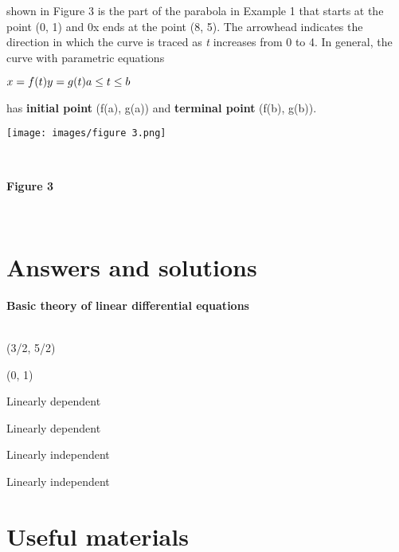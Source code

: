 \documentclass{article}
\begin{document}
shown in Figure 3 is the part of the parabola in Example 1 that starts at the point (0, 1) and 0x ends at the point (8, 5). The arrowhead indicates the direction in which the curve is traced
as \textsl{t} increases from 0 to 4.
\indent\setlength{\parindent}{1em} In general, the curve with parametric equations
\begin{center}
\begin{math}
    x = f(t) \\ 
    y = g(t)\\
    a \leq t \leq b
\end{math}
\end{center}

has \textbf{initial point} (f(a), g(a)) and \textbf{terminal point} (f(b), g(b)).

\begin{center}
\texttt{[image: images/figure 3.png]}
\end{center}\\
\begin{center}
\textbf{Figure 3}
\end{center}\\

\section{Answers and solutions}
\textbf{Basic theory of linear differential equations}\\
\\
\begin{enumerate*}
  \item  (3/2, 5/2)   
  \item  (0, 1)   
  \item  Linearly dependent   
  \item  Linearly dependent   
  \item  Linearly independent   
  \item Linearly independent   
\end{enumerate*}


\section{Useful materials}
\end{document}
